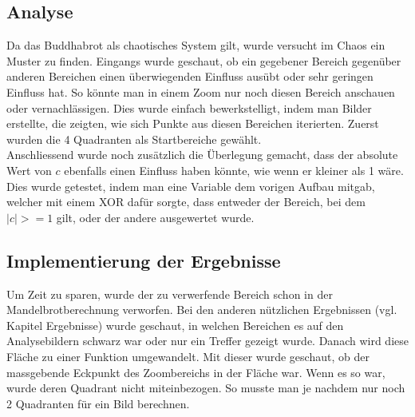 \subsection{Analyse}
Da das Buddhabrot als chaotisches System gilt, wurde versucht im Chaos ein Muster zu finden. Eingangs wurde geschaut, ob ein gegebener Bereich gegenüber anderen Bereichen einen überwiegenden Einfluss ausübt oder sehr geringen Einfluss hat. So könnte man in einem Zoom nur noch diesen Bereich anschauen oder vernachlässigen. Dies wurde einfach bewerkstelligt, indem man Bilder erstellte, die zeigten, wie sich Punkte aus diesen Bereichen iterierten. Zuerst wurden die 4 Quadranten als Startbereiche gewählt.
\\
Anschliessend wurde noch zusätzlich die Überlegung gemacht, dass der absolute Wert von $c$ ebenfalls einen Einfluss haben könnte, wie wenn er kleiner als 1 wäre. Dies wurde getestet, indem man eine Variable dem vorigen Aufbau mitgab, welcher mit einem XOR dafür sorgte, dass entweder der Bereich, bei dem $|c|>=1$ gilt, oder der andere ausgewertet wurde.
\subsection{Implementierung der Ergebnisse}
Um Zeit zu sparen, wurde der zu verwerfende Bereich schon in der Mandelbrotberechnung verworfen. Bei den anderen nützlichen Ergebnissen (vgl. Kapitel Ergebnisse) wurde geschaut, in welchen Bereichen es auf den Analysebildern schwarz war oder nur ein Treffer gezeigt wurde. Danach wird diese Fläche zu einer Funktion umgewandelt. Mit dieser wurde geschaut, ob der massgebende Eckpunkt des Zoombereichs in der Fläche war. Wenn es so war, wurde deren Quadrant nicht miteinbezogen. So musste man je nachdem nur noch 2 Quadranten für ein Bild berechnen.